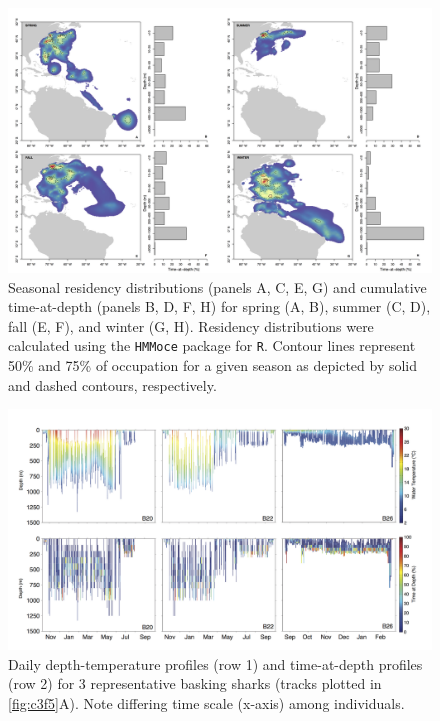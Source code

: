 \begin{figure}[t!]
\centering
\includegraphics[width=1\textwidth]{images/C3_Fig3.jpg}
\caption[Basking shark seasonal residency distributions]{Seasonal residency distributions (panels A, C, E, G) and cumulative time-at-depth (panels B, D, F, H) for spring (A, B), summer (C, D), fall (E, F), and winter (G, H). Residency distributions were calculated using the \texttt{HMMoce} package for \texttt{R}. Contour lines represent 50\% and 75\% of occupation for a given season as depicted by solid and dashed contours, respectively. }
\label{fig:c3f3}
\end{figure}

\begin{figure}[t!]
\centering
\includegraphics[width=1\textwidth]{images/C3_Fig4.jpg}
\caption[Representative basking shark vertical data]{Daily depth-temperature profiles (row 1) and time-at-depth profiles (row 2) for 3 representative basking sharks (tracks plotted in \cref{fig:c3f5}A). Note differing time scale (x-axis) among individuals.}
\label{fig:c3f4}
\end{figure}


